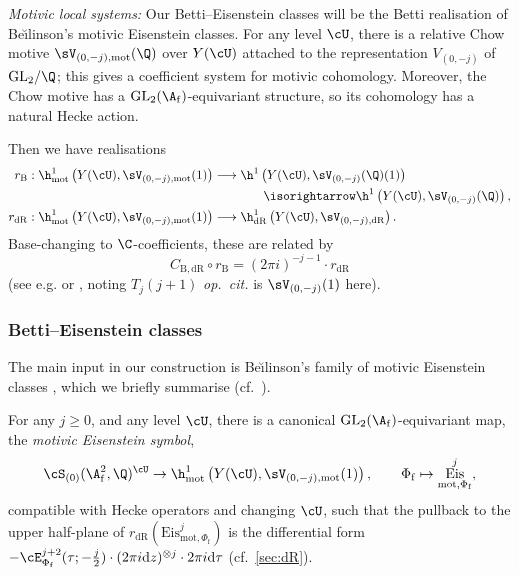 \documentclass[10pt,reqno,a4paper]{amsart}
\newcommand{\Phif}{{\Phi\subf}}
\newcommand{\subf}{_{\mathrm{f}}}
\DeclareMathOperator{\Eis}{Eis}
\newcommand{\GL}{\mathrm{GL}}
\begin{document}
\emph{Motivic local systems:}
Our Betti--Eisenstein classes will be the Betti realisation of Be\u{\i}linson's motivic Eisenstein classes. For any level $\cU$, there is a relative Chow motive $\sV_{(0,-j),\mathrm{mot}}(\Q)$ over $Y(\cU)$ attached to the representation $V_{(0,-j)}$ of $\GL_2/\Q$; this gives a coefficient system for motivic cohomology. Moreover, the Chow motive has a $\GL_2(\A\subf)$-equivariant structure, so its cohomology has a natural Hecke action.

Then we have realisations
\begin{align*}
r_{\mathrm{B}} : \h^1_{\mathrm{mot}}\left(Y(\cU), \sV_{(0,-j),\mathrm{mot}}(1)\right) &\longrightarrow \h^1\left(Y(\cU), \sV_{(0,-j)}(\Q)(1)\right)\\
&\hspace{40pt} \isorightarrow \h^1\left(Y(\cU), \sV_{(0,-j)}(\Q)\right), \\
r_{\mathrm{dR}} : \h^1_{\mathrm{mot}}\left(Y(\cU), \sV_{(0,-j),\mathrm{mot}}(1)\right) &\longrightarrow \h^1_{\mathrm{dR}}\left(Y(\cU), \sV_{(0,-j),\mathrm{dR}}\right).
\end{align*}
Base-changing to $\C$-coefficients, these are related by
\begin{equation}\label{eq:comparison}
C_{\mathrm{B,dR}}\circ r_{\mathrm{B}} = (2\pi i)^{-j-1} \cdot r_{\mathrm{dR}}
\end{equation}
(see e.g. \cite[\S2.2]{KLZ20} or \cite[pf.\ of Prop.\ 5.2]{LW18}, noting $T_j(j+1)$ \emph{op.\ cit.} is $\sV_{(0,-j)}(1)$ here).

\subsubsection{Betti--Eisenstein classes}
The main input in our construction is Be\u{\i}linson's family of motivic Eisenstein classes \cite{Bei86}, which we briefly summarise (cf.\ \cite[Thm.\ 7.2.2]{LSZ17}).


\begin{theorem}[Be\u{\i}linson] \label{thm:motivic classes}
For any $j \ge 0$, and any level $\cU$, there is a canonical $\GL_2(\A\subf)$-equivariant map, the \emph{motivic Eisenstein symbol},
\[
\cS_{(0)}(\A\subf^2, \Q)^{\cU}\to \h^1_{\mathrm{mot}}\left(Y(\cU), \sV_{(0,-j),\mathrm{mot}}(1)\right),\qquad \Phif \mapsto \Eis^j_{\mathrm{mot},\Phif},
\]
compatible with Hecke operators and changing $\cU$, such that the pullback to the upper half-plane of $r_{\mathrm{dR}}(\mathrm{Eis}_{\mathrm{mot},\Phif}^j)$ is the differential form $-\cE^{j+2}_\Phif(\tau;-\tfrac{j}{2}) \cdot (2\pi i\mathrm{d}z)^{\otimes j} \cdot 2\pi i\mathrm{d}\tau$ (cf.\ \cref{sec:dR}).
\end{theorem}
\end{document}

